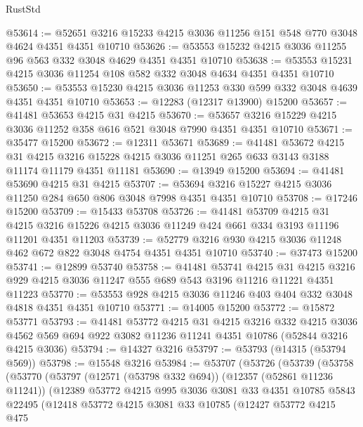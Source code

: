 \begin{lexlean}{RustStd}
\begin{coremodule}
@53614 := @52651 @3216 @15233 @4215 @3036 @11256 @151 @548 @770 @3048 @4624 @4351 @4351 @10710
@53626 := @53553 @15232 @4215 @3036 @11255 @96 @563 @332 @3048 @4629 @4351 @4351 @10710
@53638 := @53553 @15231 @4215 @3036 @11254 @108 @582 @332 @3048 @4634 @4351 @4351 @10710
@53650 := @53553 @15230 @4215 @3036 @11253 @330 @599 @332 @3048 @4639 @4351 @4351 @10710
@53653 := @12283 (@12317 @13900) @15200
@53657 := @41481 @53653 @4215 @31 @4215
@53670 := @53657 @3216 @15229 @4215 @3036 @11252 @358 @616 @521 @3048 @7990 @4351 @4351 @10710
@53671 := @35477 @15200
@53672 := @12311 @53671
@53689 := @41481
    @53672
    @4215
    @31
    @4215
    @3216
    @15228
    @4215
    @3036
    @11251
    @265
    @633
    @3143
    @3188
    @11174
    @11179
    @4351
    @11181
@53690 := @13949 @15200
@53694 := @41481 @53690 @4215 @31 @4215
@53707 := @53694 @3216 @15227 @4215 @3036 @11250 @284 @650 @806 @3048 @7998 @4351 @4351 @10710
@53708 := @17246 @15200
@53709 := @15433 @53708
@53726 := @41481
    @53709
    @4215
    @31
    @4215
    @3216
    @15226
    @4215
    @3036
    @11249
    @424
    @661
    @334
    @3193
    @11196
    @11201
    @4351
    @11203
@53739 := @52779 @3216 @930 @4215 @3036 @11248 @462 @672 @822 @3048 @4754 @4351 @4351 @10710
@53740 := @37473 @15200
@53741 := @12899 @53740
@53758 := @41481
    @53741
    @4215
    @31
    @4215
    @3216
    @929
    @4215
    @3036
    @11247
    @555
    @689
    @543
    @3196
    @11216
    @11221
    @4351
    @11223
@53770 := @53553 @928 @4215 @3036 @11246 @403 @404 @332 @3048 @4818 @4351 @4351 @10710
@53771 := @14005 @15200
@53772 := @15872 @53771
@53793 := @41481
    @53772
    @4215
    @31
    @4215
    @3216
    @332
    @4215
    @3036
    @4562
    @569
    @694
    @922
    @3082
    @11236
    @11241
    @4351
    @10786
    (@52844 @3216 @4215 @3036)
@53794 := @14327 @3216
@53797 := @53793 (@14315 (@53794 @569))
@53798 := @15548 @3216
@53984 := @53707
    (@53726
      (@53739
        (@53758
          (@53770
            (@53797
              (@12571 (@53798 @332 @694))
              (@12357 (@52861 @11236 @11241))
              (@12389
                @53772
                @4215
                @995
                @3036
                @3081
                @33
                @4351
                @10785
                @5843
                @22495
                (@12418
                  @53772
                  @4215
                  @3081
                  @33
                  @10785
                  (@12427
                    @53772
                    @4215
                    @475

\end{coremodule}
\end{lexlean}
